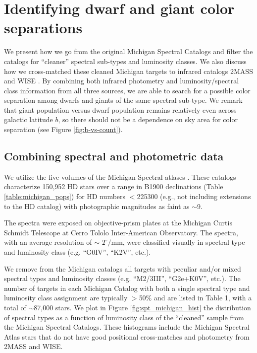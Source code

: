 \chapter{Identifying dwarf and giant color separations} \label{chap:2}

We present how we go from the original Michigan Spectral Catalogs \citep{Houk1975,Houk1978,Houk1982,Houk1988,Houk1999} and filter the catalogs for ``cleaner'' spectral sub-types and luminosity classes. We also discuss how we cross-matched these cleaned Michigan targets to infrared catalogs 2MASS and WISE \citep{2MASS,ALLWISE}. By combining both infrared photometry and luminosity/spectral class information from all three sources, we are able to search for a possible color separation among dwarfs and giants of the same spectral sub-type. We remark that giant population versus dwarf population remains relatively even across galactic latitude $b$, so there should not be a dependence on sky area for color separation (see Figure \ref{fig:b-vs-count}).

\section{Combining spectral and photometric data} \label{sec:cross-matching}
We utilize the five volumes of the Michigan Spectral atlases \citep[]{Houk1975, Houk1978, Houk1982,Houk1988,Houk1999}. These catalogs characterize 150,952 HD stars over a range in B1900 declinations (Table \ref{table:michigan_pops}) for HD numbers $<$225300 (e.g., not including extensions to the HD catalog) with photographic magnitudes as faint as $\sim$9.

The spectra were exposed on objective-prism plates at the Michigan Curtis Schmidt Telescope at Cerro Tololo Inter-American Observatory. The spectra, with an average resolution of $\sim$ $2^\circ / $mm, were classified visually in spectral type and luminosity class (e.g. ``G0IV'', ``K2V'', etc.).  

We remove from the Michigan catalogs all targets with peculiar and/or mixed spectral types and luminosity classes (e.g. ``M2/3III'', ``G2e+K0V'', etc.).  The  number of targets in each Michigan Catalog with both a single spectral type and luminosity class assignment are typically $>$50\% and are listed in Table 1, with a total of $\sim$87,000 stars. We plot in Figure \ref{fig:spt_michigan_hist} the distribution of spectral types as a function of luminosity class of the ``cleaned'' sample from the Michigan Spectral Catalogs.  These histograms include the Michigan Spectral Atlas stars that do not have good positional cross-matches and photometry from 2MASS and WISE. 

